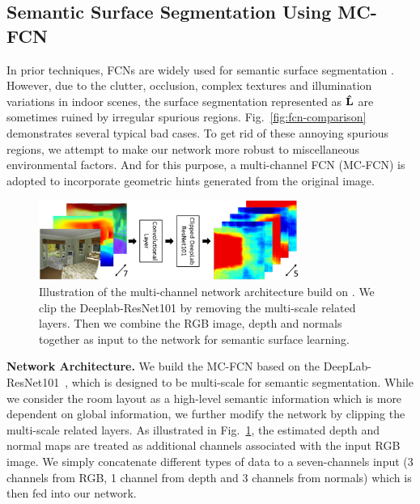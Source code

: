 \subsection{Semantic Surface Segmentation Using MC-FCN}
\label{sec:surfacelabel}
In prior techniques, FCNs are widely used for semantic surface segmentation \cite{dasgupta2016delay,ren2016coarse,mallya2015learning}. 
%
However, due to the clutter, occlusion, complex textures and illumination variations in indoor scenes, the surface segmentation represented as $\mathbf{\hat{L}}$ are sometimes ruined by irregular spurious regions. 
Fig.~\ref{fig:fcn-comparison} demonstrates several typical bad cases.
%
To get rid of these annoying spurious regions, we attempt to make our network more robust to miscellaneous environmental factors. 
And for this purpose, a multi-channel FCN (MC-FCN) is adopted to incorporate geometric hints generated from the original image. 
%


\begin{figure}
	\centering
	\includegraphics[width=8.5cm]{figure/MC-FCN.png}
	\caption{Illustration of the multi-channel network architecture build on \cite{chen2016deeplab}. We clip the Deeplab-ResNet101 by removing the multi-scale related layers. Then we combine the RGB image, depth and normals together as input to the network for semantic surface learning. }
	\label{fig:fcn-multi-channel}
\end{figure}


\noindent\textbf{Network Architecture.}
We build the MC-FCN based on the DeepLab-ResNet101~\cite{chen2016deeplab}, which is designed to be multi-scale for semantic segmentation. 
%
While we consider the room layout as a high-level semantic information which is more dependent on global information, we further modify the network by clipping the multi-scale related layers. 
As illustrated in Fig.~\ref{fig:fcn-multi-channel}, the estimated depth and normal maps are treated as additional channels associated with the input RGB image. 
We simply concatenate different types of data to a seven-channels input (3 channels from RGB, 1 channel from depth and 3 channels from normals) which is then fed into our network.

